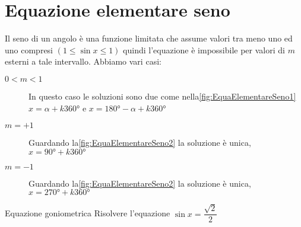 \section{Equazione elementare seno}
\begin{figure}
	\begin{subfigure}[b]{.5\linewidth}
		\centering
		
		\label{fig:EquaElementareSeno4}
	\end{subfigure}%
	\begin{subfigure}[b]{.5\linewidth}
		\centering
		
		\label{fig:EquaElementareCoseno4}
	\end{subfigure}
	\label{fig:EquaElementareSenoCoseno2}
\end{figure}
Il seno di un angolo è una funzione limitata che assume valori  tra meno uno ed uno compresi $(1\leq\sin x\leq 1)$ quindi l'equazione è impossibile per valori di $m$ esterni a tale intervallo. Abbiamo vari casi:
\begin{description}
	\item[$0<m<1$] In questo caso le soluzioni sono due come nella\nobs\vref{fig:EquaElementareSeno1} $x=\alpha+k\ang{360}$ e $x=\ang{180}-\alpha+k\ang{360}$
	\item [$m=+1$] Guardando la\nobs\vref{fig:EquaElementareSeno2} la soluzione è unica, $x=\ang{90}+k\ang{360}$
	\item [$m=-1$] Guardando la\nobs\vref{fig:EquaElementareSeno2} la soluzione è unica, $x=\ang{270}+k\ang{360}$
\end{description} 
\begin{figure}
	\begin{subfigure}[b]{.5\linewidth}
		\centering
			
			\label{fig:EquaElementareSeno1}
	\end{subfigure}%
	\begin{subfigure}[b]{.5\linewidth}
		\centering
		
		\label{fig:EquaElementareCoseno1}
	\end{subfigure}
	\label{fig:EquaElementareSenoCoseno}
\end{figure}
\begin{esempiot}{Equazione goniometrica}{}
Risolvere l'equazione $\sin x =\dfrac{\sqrt{2}}{2}$
\end{esempiot}
